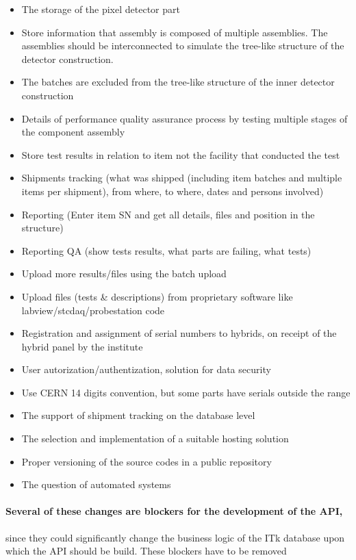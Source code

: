 \begin{itemize}
\item The storage of the pixel detector part %
\item Store information that assembly is composed of multiple assemblies. The assemblies should be interconnected to simulate the tree-like structure of the detector construction. 
\item The batches are excluded from the tree-like structure of the inner detector construction
\item Details of performance quality assurance process by testing multiple stages of the component assembly
\item Store test results	 in relation to item not the facility that conducted the test
\item Shipments tracking (what was shipped (including item batches and multiple items per shipment), from where, to where, dates and persons involved)
\item Reporting (Enter item SN and get all details, files and position in the structure)
\item Reporting QA (show tests results, what parts are failing, what tests)
\item Upload more results/files using the batch upload
\item Upload files (tests \& descriptions) from proprietary software like labview/stcdaq/probestation code
\item Registration and assignment of serial numbers to hybrids, on receipt of the hybrid panel by the institute
\item User autorization/authentization, solution for data security
\item Use CERN 14 digits convention, but some parts have serials outside the range
\item The support of shipment tracking on the database level
\item The selection and implementation of a suitable hosting solution
\item Proper versioning of the source codes in a public repository
\item The question of automated systems
\end{itemize}

\paragraph{Several of these changes are blockers for the development of the API,} since they could significantly change the business logic of the ITk database upon which the API should be build. These blockers have to be removed %


